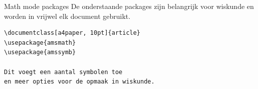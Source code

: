 \begin{frame}[fragile]{Math mode packages}
De onderstaande packages zijn belangrijk voor wiskunde en 
worden in vrijwel elk document gebruikt.
\begin{verbatim}
\documentclass[a4paper, 10pt]{article}
\usepackage{amsmath}
\usepackage{amssymb}

Dit voegt een aantal symbolen toe
en meer opties voor de opmaak in wiskunde.

\end{verbatim}
\end{frame}